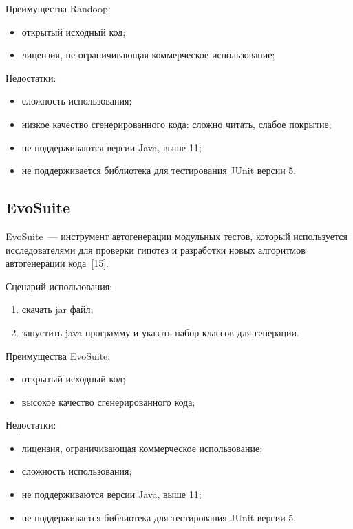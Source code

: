 Преимущества Randoop: 

\begin{itemize}
	\item открытый исходный код;
	\item лицензия, не ограничивающая коммерческое использование;
\end{itemize}

Недостатки:

\begin{itemize}
	\item сложность использования;
	\item низкое качество сгенерированного кода: сложно читать, слабое покрытие;
	\item не поддерживаются версии Java, выше 11;
	\item не поддерживается библиотека для тестирования JUnit версии 5.
\end{itemize}

\subsection{EvoSuite}

EvoSuite~--- инструмент автогенерации модульных тестов, который используется исследователями для проверки 
гипотез и разработки новых алгоритмов автогенерации кода~[15].

Сценарий использования: 

\begin{enumerate}
	\item скачать jar файл;
	\item запустить java программу и указать набор классов для генерации.
\end{enumerate}

Преимущества EvoSuite: 

\begin{itemize}
	\item открытый исходный код;
	\item высокое качество сгенерированного кода;
\end{itemize}

Недостатки:

\begin{itemize}
	\item лицензия, ограничивающая коммерческое использование;
	\item сложность использования;
	\item не поддерживаются версии Java, выше 11;
	\item не поддерживается библиотека для тестирования JUnit версии 5.
\end{itemize}

